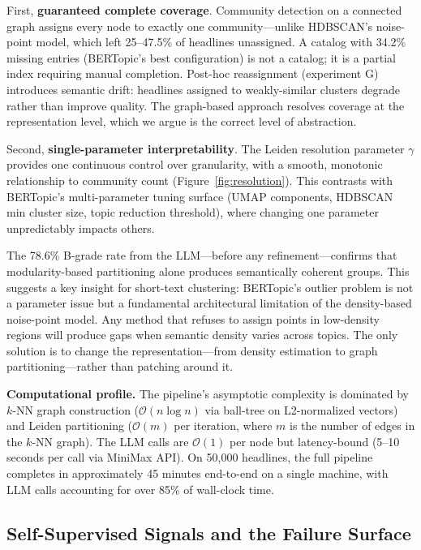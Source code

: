 \documentclass[10pt,twocolumn,twoside]{article}
\begin{document}
First, \textbf{guaranteed complete coverage}. Community detection on a connected graph assigns 
every node to exactly one community---unlike HDBSCAN's noise-point model, which left 
25--47.5\% of headlines unassigned. A catalog with 34.2\% missing entries (BERTopic's best 
configuration) is not a catalog; it is a partial index requiring manual completion. Post-hoc 
reassignment (experiment G) introduces semantic drift: headlines assigned to weakly-similar 
clusters degrade rather than improve quality. The graph-based approach resolves coverage at 
the representation level, which we argue is the correct level of abstraction.

Second, \textbf{single-parameter interpretability}. The Leiden resolution parameter $\gamma$ 
provides one continuous control over granularity, with a smooth, monotonic relationship to 
community count (Figure~\ref{fig:resolution}). This contrasts with BERTopic's multi-parameter 
tuning surface (UMAP components, HDBSCAN min cluster size, topic reduction threshold), where 
changing one parameter unpredictably impacts others.

The 78.6\% B-grade rate from the LLM---before any refinement---confirms that modularity-based 
partitioning alone produces semantically coherent groups. This suggests a key insight for 
short-text clustering: BERTopic's outlier problem is not a parameter issue but a fundamental 
architectural limitation of the density-based noise-point model. Any method that refuses to 
assign points in low-density regions will produce gaps when semantic density varies across 
topics. The only solution is to change the representation---from density estimation to graph 
partitioning---rather than patching around it.

\textbf{Computational profile.} The pipeline's asymptotic complexity is dominated by $k$-NN 
graph construction ($\mathcal{O}(n \log n)$ via ball-tree on L2-normalized vectors) and 
Leiden partitioning ($\mathcal{O}(m)$ per iteration, where $m$ is the number of edges in 
the $k$-NN graph). The LLM calls are $\mathcal{O}(1)$ per node but latency-bound 
(5--10 seconds per call via MiniMax API). On 50,000 headlines, the full pipeline completes 
in approximately 45 minutes end-to-end on a single machine, with LLM calls accounting for 
over 85\% of wall-clock time.

\subsection{Self-Supervised Signals and the Failure Surface}
\end{document}
